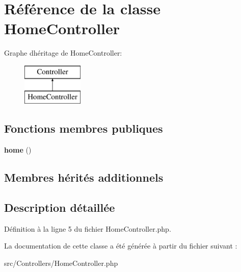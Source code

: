\hypertarget{class_controllers_1_1_home_controller}{}\section{Référence de la classe Home\+Controller}
\label{class_controllers_1_1_home_controller}
Graphe d\textquotesingle{}héritage de Home\+Controller\+:\begin{figure}[H]
\begin{center}
\leavevmode
\includegraphics[height=2.000000cm]{class_controllers_1_1_home_controller}
\end{center}
\end{figure}
\subsection*{Fonctions membres publiques}
\begin{DoxyCompactItemize}
\item 
{\bfseries home} ()\hypertarget{class_controllers_1_1_home_controller_a174b8e4c7d4d7363c6f773671defdeff}{}\label{class_controllers_1_1_home_controller_a174b8e4c7d4d7363c6f773671defdeff}

\end{DoxyCompactItemize}
\subsection*{Membres hérités additionnels}


\subsection{Description détaillée}


Définition à la ligne 5 du fichier Home\+Controller.\+php.



La documentation de cette classe a été générée à partir du fichier suivant \+:\begin{DoxyCompactItemize}
\item 
src/\+Controllers/Home\+Controller.\+php\end{DoxyCompactItemize}
